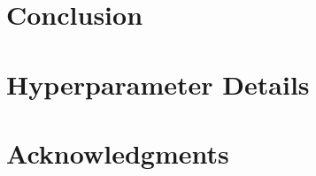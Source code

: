 \documentclass[journal]{IEEEtran}
\begin{document}
\section{Conclusion}
\label{sec:conclusion}

\appendices
\section{Hyperparameter Details}

\section*{Acknowledgments}



\end{document}
